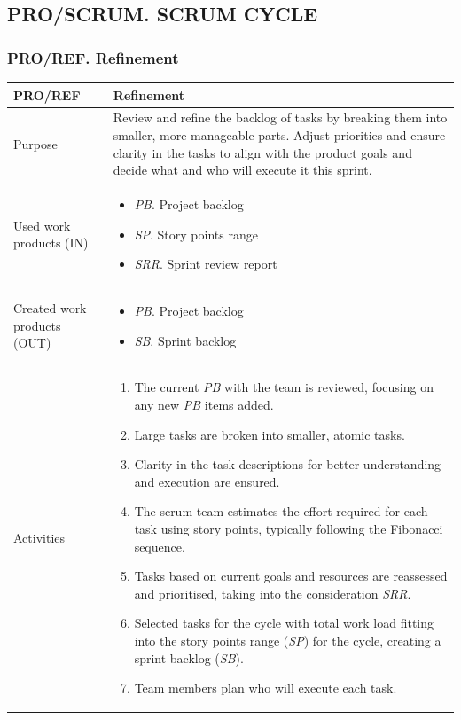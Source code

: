 \newpage
\subsection{PRO/SCRUM. SCRUM CYCLE }

\subsubsection{PRO/REF. Refinement }

\begin{table}[h!]
\begin{tabular}{l|p{}}
\hline
\textbf{PRO/REF}        & \textbf{Refinement} \\ \hline
Purpose & Review and refine the backlog of tasks by breaking them into smaller, more manageable parts. Adjust priorities and ensure clarity in the tasks to align with the product goals and decide what and who will execute it this sprint. \\ \hline
Used work products (IN)   &      
\begin{itemize}
    \item \textit{PB}. Project backlog
    \item \textit{SP}. Story points range
    \item \textit{SRR}. Sprint review report
\end{itemize}
\\ \hline
Created work products (OUT) &     
\begin{itemize}
    \item \textit{PB}. Project backlog
    \item \textit{SB}. Sprint backlog
\end{itemize}
\\ \hline
Activities            &   
\begin{enumerate}
    \item The current \textit{PB} with the team is reviewed, focusing on any new \textit{PB} items added.
    \item Large tasks are broken into smaller, atomic tasks.
    \item Clarity in the task descriptions for better understanding and execution are ensured.
    \item The scrum team  estimates the effort required for each task using story points, typically following the Fibonacci sequence.
    \item Tasks based on current goals and resources are reassessed and prioritised, taking into the consideration \textit{SRR}.
    \item Selected tasks for the cycle with total work load fitting into the story points range (\textit{SP}) for the cycle, creating a sprint backlog (\textit{SB}).
    \item Team members plan who will execute each task.  
\end{enumerate}
\end{tabular}
\label{PRO/REF}
\end{table}

